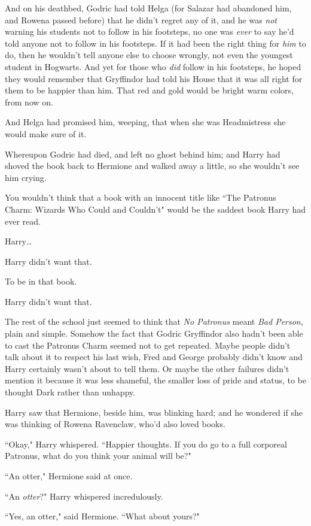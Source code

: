 And on his deathbed, Godric had told Helga (for Salazar had abandoned him, and Rowena passed before) that he didn't regret any of it, and he was \emph{not} warning his students not to follow in his footsteps, no one was \emph{ever} to say he'd told anyone not to follow in his footsteps. If it had been the right thing for \emph{him} to do, then he wouldn't tell anyone else to choose wrongly, not even the youngest student in Hogwarts. And yet for those who \emph{did} follow in his footsteps, he hoped they would remember that Gryffindor had told his House that it was all right for them to be happier than him. That red and gold would be bright warm colors, from now on.

And Helga had promised him, weeping, that when she was Headmistress she would make sure of it.

Whereupon Godric had died, and left no ghost behind him; and Harry had shoved the book back to Hermione and walked away a little, so she wouldn't see him crying.

You wouldn't think that a book with an innocent title like ``The Patronus Charm: Wizards Who Could and Couldn't" would be the saddest book Harry had ever read.

Harry{\ldots}

Harry didn't want that.

To be in that book.

Harry didn't want that.

The rest of the school just seemed to think that \emph{No Patronus} meant \emph{Bad Person,} plain and simple. Somehow the fact that Godric Gryffindor also hadn't been able to cast the Patronus Charm seemed not to get repeated. Maybe people didn't talk about it to respect his last wish, Fred and George probably didn't know and Harry certainly wasn't about to tell them. Or maybe the other failures didn't mention it because it was less shameful, the smaller loss of pride and status, to be thought Dark rather than unhappy.

Harry saw that Hermione, beside him, was blinking hard; and he wondered if she was thinking of Rowena Ravenclaw, who'd also loved books.

``Okay," Harry whispered. ``Happier thoughts. If you do go to a full corporeal Patronus, what do you think your animal will be?"

``An otter," Hermione said at once.

``An \emph{otter}?" Harry whispered incredulously.

``Yes, an otter," said Hermione. ``What about yours?"

